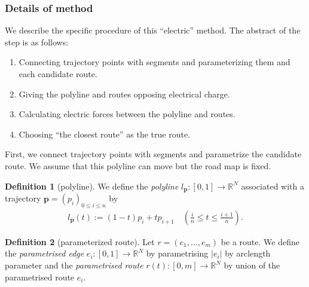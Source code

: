 \documentclass{article}
\numberwithin{equation}{section}
\theoremstyle{definition}
\newtheorem{definition}{Definition}[section]
\newcommand{\R}{\mathbb{R}}
\begin{document}
\subsubsection{Details of method}
We describe the specific procedure of this ``electric'' method. 
The abstract of the step is as follows:
\begin{enumerate}
    \item
    Connecting trajectory points with segments and parameterizing them and each candidate route.
    \item
    Giving the polyline and routes opposing electrical charge.
    \item
    Calculating electric forces between the polyline and routes.
    \item
    Choosing ``the closest route'' as the true route.
\end{enumerate}

First, we connect trajectory points with segments and parametrize the candidate route.
We assume that this polyline can move but the road map is fixed.

\begin{definition}[polyline]
   We define the \emph{polyline} $l_{\mathbf{p}}:[0,1]\to\R^{N}$ associated with a trajectory $\mathbf{p}=(p_{i})_{0\le i\le n}$ by
    \begin{align}
        l_{\mathbf{p}}(t) := (1-t)p_{i}+tp_{i+1} \quad\left(\frac{i}{n}\le t \le\frac{i+1}{n}\right).
    \end{align}
\end{definition}

\begin{definition}[parameterized route]
    Let  $r=(e_{1},\dots,e_{m})$ be a route.
    We define the \emph{parametrised edge} $e_{i}:[0,1]\to\R^{N}$ by parametrising $|e_{i}|$ by arclength parameter and the \emph{parametrised route} $r(t):[0,m]\to\R^{N}$ by union of the parametrised route $e_{i}$. 
\end{definition}
\end{document}
